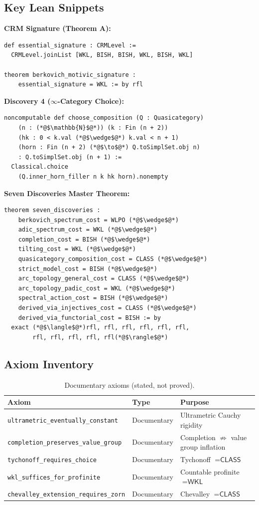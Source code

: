 \documentclass[11pt,a4paper]{article}
\theoremstyle{plain}
\theoremstyle{definition}
\newcommand{\WKL}{\textsf{WKL}}
\newcommand{\CLASS}{\textsf{CLASS}}
\begin{document}
\subsection{Key Lean Snippets}

\textbf{CRM Signature (Theorem A):}
\begin{lstlisting}
def essential_signature : CRMLevel :=
  CRMLevel.joinList [WKL, BISH, BISH, WKL, BISH, WKL]

theorem berkovich_motivic_signature :
    essential_signature = WKL := by rfl
\end{lstlisting}

\textbf{Discovery 4 ($\infty$-Category Choice):}
\begin{lstlisting}
noncomputable def choose_composition (Q : Quasicategory)
    (n : (*@$\mathbb{N}$@*)) (k : Fin (n + 2))
    (hk : 0 < k.val (*@$\wedge$@*) k.val < n + 1)
    (horn : Fin (n + 2) (*@$\to$@*) Q.toSimplSet.obj n)
    : Q.toSimplSet.obj (n + 1) :=
  Classical.choice
    (Q.inner_horn_filler n k hk horn).nonempty
\end{lstlisting}

\textbf{Seven Discoveries Master Theorem:}
\begin{lstlisting}
theorem seven_discoveries :
    berkovich_spectrum_cost = WLPO (*@$\wedge$@*)
    adic_spectrum_cost = WKL (*@$\wedge$@*)
    completion_cost = BISH (*@$\wedge$@*)
    tilting_cost = WKL (*@$\wedge$@*)
    quasicategory_composition_cost = CLASS (*@$\wedge$@*)
    strict_model_cost = BISH (*@$\wedge$@*)
    arc_topology_general_cost = CLASS (*@$\wedge$@*)
    arc_topology_padic_cost = WKL (*@$\wedge$@*)
    spectral_action_cost = BISH (*@$\wedge$@*)
    derived_via_injectives_cost = CLASS (*@$\wedge$@*)
    derived_via_functorial_cost = BISH := by
  exact (*@$\langle$@*)rfl, rfl, rfl, rfl, rfl, rfl,
        rfl, rfl, rfl, rfl, rfl(*@$\rangle$@*)
\end{lstlisting}

\subsection{Axiom Inventory}

\begin{table}[ht]
\centering
\begin{tabular}{@{}lll@{}}
\toprule
\textbf{Axiom} & \textbf{Type} & \textbf{Purpose} \\
\midrule
\texttt{ultrametric\_eventually\_constant} & Documentary & Ultrametric Cauchy rigidity \\
\texttt{completion\_preserves\_value\_group} & Documentary & Completion $\not\Rightarrow$ value group inflation \\
\texttt{tychonoff\_requires\_choice} & Documentary & Tychonoff $= \CLASS$ \\
\texttt{wkl\_suffices\_for\_profinite} & Documentary & Countable profinite $= \WKL$ \\
\texttt{chevalley\_extension\_requires\_zorn} & Documentary & Chevalley $= \CLASS$ \\
\bottomrule
\end{tabular}
\caption{Documentary axioms (stated, not proved).}
\label{tab:axioms}
\end{table}
\end{document}
